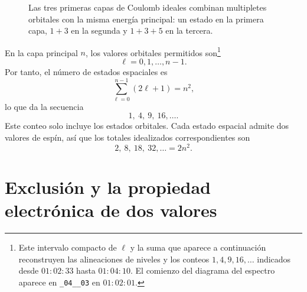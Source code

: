 \begin{figure}[htbp]
\centering
{}
\caption{Las tres primeras capas de Coulomb ideales combinan multipletes orbitales con la misma energía principal: un estado en la primera capa, \(1+3\) en la segunda y \(1+3+5\) en la tercera.}
\end{figure}

En la capa principal \(n\), los valores orbitales permitidos son\footnote{Este intervalo compacto de \(\ell\) y la suma que aparece a continuación reconstruyen las alineaciones de niveles y los conteos \(1,4,9,16,\ldots\) indicados desde \(01{:}02{:}33\) hasta \(01{:}04{:}10\). El comienzo del diagrama del espectro aparece en \texttt{\_04\_\_03} en \(01{:}02{:}01\).}
\[
\ell=0,1,\ldots,n-1.
\]
Por tanto, el número de estados espaciales es
\begin{equation}
\sum_{\ell=0}^{n-1}(2\ell+1)=n^{2},
\end{equation}
lo que da la secuencia
\begin{equation}
1,\ 4,\ 9,\ 16,\ldots .
\end{equation}
Este conteo solo incluye los estados orbitales. Cada estado espacial admite dos valores de espín, así que los totales idealizados correspondientes son
\begin{equation}
2,\ 8,\ 18,\ 32,\ldots=2n^{2}.
\end{equation}

\section{Exclusión y la propiedad electrónica de dos valores}

